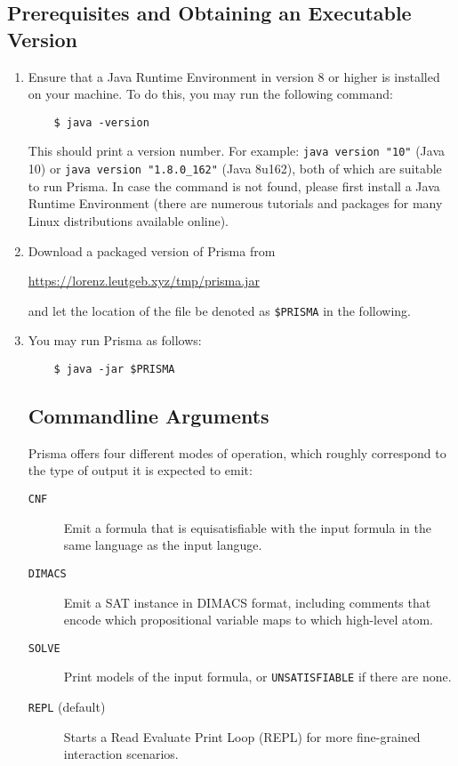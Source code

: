 \documentclass{llncs}
\begin{document}
\subsection{Prerequisites and Obtaining an Executable Version}
\begin{enumerate}
	\item{Ensure that a Java Runtime Environment in version 8 or higher is installed on your machine. To do this, you may run the following command:
	\begin{verbatim}
	$ java -version
	\end{verbatim}
	This should print a version number. For example: \texttt{java~version~"10"} (Java 10) or \texttt{java~version~"1.8.0\_162"} (Java 8u162), both of which are suitable to run Prisma. In case the command is not found, please first install a Java Runtime Environment (there are numerous tutorials and packages for many Linux distributions available online).
	}
	\item{Download a packaged version of Prisma from
	\begin{center}
	\url{https://lorenz.leutgeb.xyz/tmp/prisma.jar}
	\end{center} and let the location of the file be denoted as \texttt{\$PRISMA} in the following.}
	\item{You may run Prisma as follows:
	\begin{verbatim}
	$ java -jar $PRISMA
	\end{verbatim}
	}

\subsection{Commandline Arguments}

Prisma offers four different modes of operation, which roughly correspond to the type of output it is expected to emit:

\begin{description}
	\item[\texttt{CNF}]{Emit a formula that is equisatisfiable with the input formula in the same language as the input languge.}
	\item[\texttt{DIMACS}]{Emit a SAT instance in DIMACS format, including comments that encode which propositional variable maps to which high-level atom.}
	\item[\texttt{SOLVE}]{Print models of the input formula, or \texttt{UNSATISFIABLE} if there are none.}
	\item[\texttt{REPL} \textnormal{(default)}]{Starts a Read Evaluate Print Loop (REPL) for more fine-grained interaction scenarios.}
\end{description}

\end{enumerate}
\end{document}
